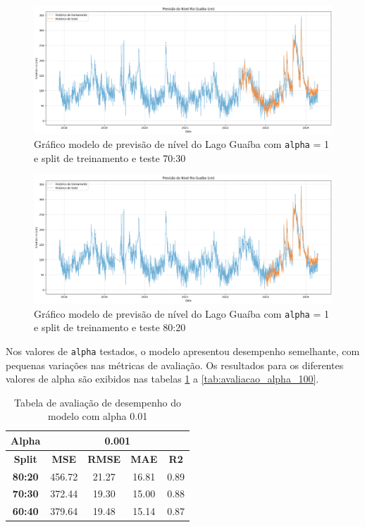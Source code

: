 \begin{figure}[H]
	\caption{\label{fig:comparacao_radiacao_nivel_rio_2}Gráfico modelo de previsão de nível do Lago Guaíba com \texttt{alpha} = 1 e split de treinamento e teste 70:30}
	\begin{center}
		\includegraphics[scale=0.35]{figuras/modelo_previsao_70_30.png}
	\end{center}
\end{figure}

\begin{figure}[H]
	\caption{\label{fig:comparacao_radiacao_nivel_rio_3}Gráfico modelo de previsão de nível do Lago Guaíba com \texttt{alpha} = 1 e split de treinamento e teste 80:20}
	\begin{center}
		\includegraphics[scale=0.35]{figuras/modelo_previsao_80_20.png}
	\end{center}
\end{figure}

Nos valores de \texttt{alpha} testados, o modelo apresentou desempenho semelhante, com pequenas variações nas métricas de avaliação. Os resultados para os diferentes valores de alpha são exibidos nas tabelas \ref{tab:avaliacao_alpha_0_01} a \ref{tab:avaliacao_alpha_100}.

\begin{table}[H]
\centering
\begin{tabular}{|c|c|c|c|c|}
\hline
\textbf{Alpha} & \multicolumn{4}{|c|}{\textbf{0.001}} \\
\hline
\textbf{Split} & \textbf{MSE} & \textbf{RMSE} & \textbf{MAE} & \textbf{R2} \\
\hline
\textbf{80:20} & 456.72 & 21.27 & 16.81 & 0.89 \\
\textbf{70:30} & 372.44 & 19.30 & 15.00 & 0.88 \\
\textbf{60:40} & 379.64 & 19.48 & 15.14 & 0.87 \\
\hline
\end{tabular}
\caption{Tabela de avaliação de desempenho do modelo com alpha 0.01}
\label{tab:avaliacao_alpha_0_01}
\end{table}

